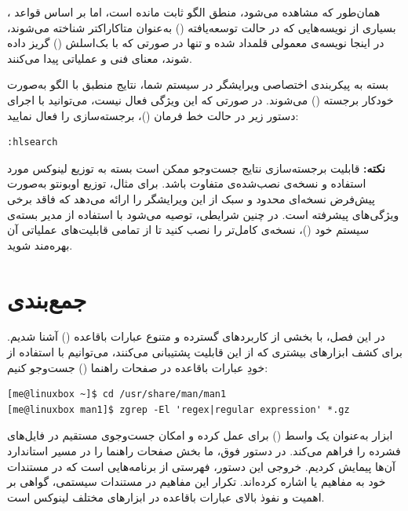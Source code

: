 همان‌طور که مشاهده می‌شود، منطق الگو ثابت مانده است، اما بر اساس قواعد ، بسیاری از نویسه‌هایی که در حالت توسعه‌یافته () به‌عنوان متاکاراکتر شناخته می‌شوند، در اینجا نویسه‌ی معمولی قلمداد شده و تنها در صورتی که با بک‌اسلش (\cmd{\textbackslash}) گریز داده شوند، معنای فنی و عملیاتی پیدا می‌کنند.

بسته به پیکربندی اختصاصی ویرایشگر  در سیستم شما، نتایج منطبق با الگو به‌صورت خودکار برجسته () می‌شوند. در صورتی که این ویژگی فعال نیست، می‌توانید با اجرای دستور زیر در حالت خط فرمان ()، برجسته‌سازی را فعال نمایید:

\begin{latin}
\begin{lstlisting}
:hlsearch
\end{lstlisting}
\end{latin}

\begin{note}
\textbf{نکته:} قابلیت برجسته‌سازی نتایج جست‌وجو ممکن است بسته به توزیع لینوکس مورد استفاده و نسخه‌ی نصب‌شده‌ی  متفاوت باشد. برای مثال، توزیع اوبونتو به‌صورت پیش‌فرض نسخه‌ای محدود و سبک از این ویرایشگر را ارائه می‌دهد که فاقد برخی ویژگی‌های پیشرفته است. در چنین شرایطی، توصیه می‌شود با استفاده از مدیر بسته‌ی سیستم خود ()، نسخه‌ی کامل‌تر را نصب کنید تا از تمامی قابلیت‌های عملیاتی آن بهره‌مند شوید.
\end{note}

\section{جمع‌بندی}

در این فصل، با بخشی از کاربردهای گسترده و متنوع عبارات باقاعده () آشنا شدیم. برای کشف ابزارهای بیشتری که از این قابلیت پشتیبانی می‌کنند، می‌توانیم با استفاده از خودِ عبارات باقاعده در صفحات راهنما () جست‌وجو کنیم:

\begin{latin}
\begin{lstlisting}
[me@linuxbox ~]$ cd /usr/share/man/man1
[me@linuxbox man1]$ zgrep -El 'regex|regular expression' *.gz
\end{lstlisting}
\end{latin}

ابزار  به‌عنوان یک واسط () برای  عمل کرده و امکان جست‌وجوی مستقیم در فایل‌های فشرده را فراهم می‌کند. در دستور فوق، ما بخش  صفحات راهنما را در مسیر استاندارد آن‌ها پیمایش کردیم. خروجی این دستور، فهرستی از برنامه‌هایی است که در مستندات خود به مفاهیم  یا  اشاره کرده‌اند. تکرار این مفاهیم در مستندات سیستمی، گواهی بر اهمیت و نفوذ بالای عبارات باقاعده در ابزارهای مختلف لینوکس است.

